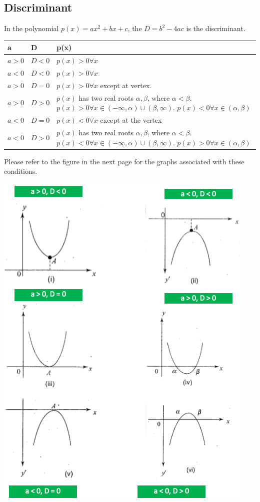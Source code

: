 \documentclass{book}
\begin{document}
	\subsection{Discriminant}
	In the polynomial $p(x) = ax^2 + bx + c$, the $D = b^2 - 4ac$ is the discriminant.
	\begin{table}[ht]
		\begin{tabular}{|l| l| l|  }
			\hline
			\textbf{a} & \textbf{D} & \textbf{p(x)}\\
			\hline
			$a>0$ & $D<0$ & $p(x) >0 \forall x$\\
			\hline
			$a<0$ & $D<0$ & $p(x) >0 \forall x$\\
			\hline
			$a>0$ & $D=0$ & $p(x) >0 \forall x$ except at vertex.\\
			\hline
			$a>0$ & $D>0$ & $p(x)$ has two real roots $\alpha, \beta$, where $\alpha < \beta$. $p(x) > 0 \forall x \in (-\infty, \alpha) \cup (\beta, \infty)$. $p(x) < 0 \forall x \in (\alpha, \beta)$ \\
			\hline
			$a<0$ & $D=0$ & $p(x) < 0 \forall x$ except at the vertex \\
			\hline
			$a<0$ & $D>0$ &  $p(x)$ has two real roots $\alpha, \beta$, where $\alpha < \beta$. $p(x) < 0 \forall x \in (-\infty, \alpha) \cup (\beta, \infty)$. $p(x) > 0 \forall x \in (\alpha, \beta)$ \\
			\hline
		\end{tabular}
	\end{table}
	
	Please refer to the figure in the next page for the graphs associated with these conditions.
	
	\includegraphics[scale=0.7]{parabolad} 
	
\end{document}
